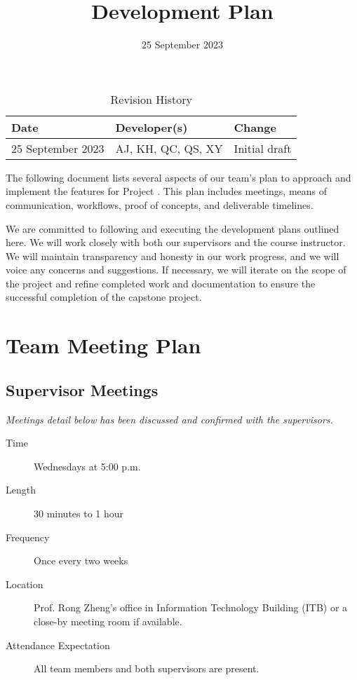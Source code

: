 \documentclass{article}
\title{Development Plan\\\progname}
\author{\authname}
\date{25 September 2023}
\begin{document}
\maketitle

\begin{table}[hp]
  \caption{Revision History} \label{TblRevisionHistory}
  \begin{tabularx}{\textwidth}{llX}
    \toprule
    \textbf{Date} & \textbf{Developer(s)} & \textbf{Change} \\
    \midrule
    25 September 2023 & AJ, KH, QC, QS, XY & Initial draft \\
    \bottomrule
  \end{tabularx}
\end{table}

The following document lists several aspects of our team's plan to approach and
implement the features for Project \projname. This plan includes meetings, means
of communication, workflows, proof of concepts, and deliverable timelines.

We are committed to following and executing the development plans outlined here.
We will work closely with both our supervisors and the course instructor. We
will maintain transparency and honesty in our work progress, and we will voice
any concerns and suggestions. If necessary, we will iterate on the scope of the
project and refine completed work and documentation to ensure the successful
completion of the capstone project.

\section{Team Meeting Plan}

\subsection{Supervisor Meetings}

\emph{Meetings detail below has been discussed and confirmed with the supervisors.}

\begin{description}
\item[Time] Wednesdays at 5:00 p.m.
\item[Length] 30 minutes to 1 hour
\item[Frequency] Once every two weeks
\item[Location] Prof. Rong Zheng's office in Information Technology Building (ITB)
  or a close-by meeting room if available.
\item[Attendance Expectation] All team members and both supervisors are present.
\end{description}
\end{document}
